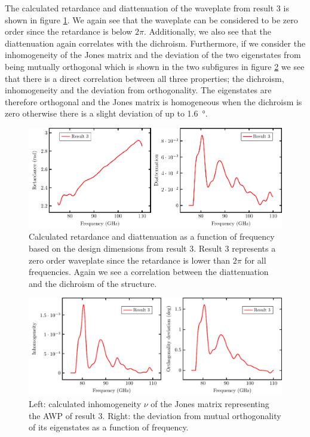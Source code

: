 The calculated retardance and diattenuation of the waveplate from result 3 is shown in figure \ref{fig:polymer_ret_and_diat}. We again see that the waveplate can be considered to be zero order since the retardance is below $2\pi$. Additionally, we also see that the diattenuation again correlates with the dichroism. Furthermore, if we consider the inhomogeneity of the Jones matrix and the deviation of the two eigenstates from being mutually orthogonal which is shown in the two subfigures in figure \ref{fig:inhomogeneity_orthogonality} we see that there is a direct correlation between all three properties; the dichroism, inhomogeneity and the deviation from orthogonality. The eigenstates are therefore orthogonal and the Jones matrix is homogeneous when the dichroism is zero otherwise there is a slight deviation of up to \SI{1.6}{\degree}. 

\begin{figure}[H]
    \centering
    \includegraphics[scale=0.7]{images/results/plots/polymer/ret_and_diat.pdf}
    \caption{Calculated retardance and diattenuation as a function of frequency based on the design dimensions from result 3. Result 3 represents a zero order waveplate since the retardance is lower than $2\pi$ for all frequencies. Again we see a correlation between the diattenuation and the dichroism of the structure.}
    \label{fig:polymer_ret_and_diat}
\end{figure}

\begin{figure}[H]
    \centering
    \includegraphics[scale=0.7]{images/results/plots/polymer/inhomogeneity_orthogonality.pdf}
    \caption{Left: calculated inhomogeneity $\nu$ of the Jones matrix representing the AWP of result 3. Right: the deviation from mutual orthogonality of its eigenstates as a function of frequency.}
    \label{fig:inhomogeneity_orthogonality}
\end{figure}

